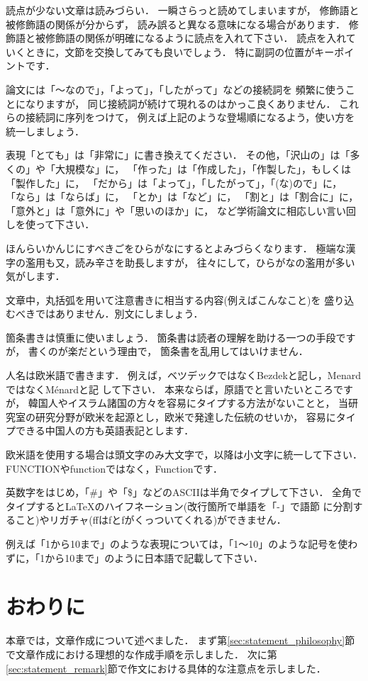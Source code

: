 \documentclass[a4j,12pt,dvipdfmx,oneside]{jsbook}
\theoremstyle{definition}
\begin{document}
読点が少ない文章は読みづらい．
一瞬さらっと読めてしまいますが，
修飾語と被修飾語の関係が分からず，
読み誤ると異なる意味になる場合があります．
修飾語と被修飾語の関係が明確になるように読点を入れて下さい．
読点を入れていくときに，文節を交換してみても良いでしょう．
特に副詞の位置がキーポイントです．

論文には「〜なので」，「よって」，「したがって」などの接続詞を
頻繁に使うことになりますが，
同じ接続詞が続けて現れるのはかっこ良くありません．
これらの接続詞に序列をつけて，
例えば上記のような登場順になるよう，使い方を統一しましょう．

表現「とても」は「非常に」に書き換えてください．
その他，「沢山の」は「多くの」や「大規模な」に，
「作った」は「作成した」，「作製した」，もしくは「製作した」に，
「だから」は「よって」，「したがって」，「(な)ので」に，
「なら」は「ならば」に，
「とか」は「など」に，
「割と」は「割合に」に，
「意外と」は「意外に」や「思いのほか」に，
など学術論文に相応しい言い回しを使って下さい．

ほんらいかんじにすべきごをひらがなにするとよみづらくなります．
極端な漢字の濫用も又，読み辛さを助長しますが，
往々にして，ひらがなの濫用が多い気がします．

文章中，丸括弧を用いて注意書きに相当する内容(例えばこんなこと)を
盛り込むべきではありません．別文にしましょう．

箇条書きは慎重に使いましょう．
箇条書は読者の理解を助ける一つの手段ですが，
書くのが楽だという理由で，
箇条書を乱用してはいけません．

人名は欧米語で書きます．
例えば，ベツデックではなくBezdekと記し，MenardではなくM\'{e}nardと記
して下さい．
本来ならば，原語でと言いたいところですが，
韓国人やイスラム諸国の方々を容易にタイプする方法がないことと，
当研究室の研究分野が欧米を起源とし，欧米で発達した伝統のせいか，
容易にタイプできる中国人の方も英語表記とします．

欧米語を使用する場合は頭文字のみ大文字で，以降は小文字に統一して下さい．
FUNCTIONやfunctionではなく，Functionです．

英数字をはじめ，「\#」や「\$」などのASCIIは半角でタイプして下さい．
全角でタイプすると\LaTeX{}のハイフネーション(改行箇所で単語を「-」で語節
に分割すること)やリガチャ(ffはfとfがくっついてくれる)ができません．

例えば「1から10まで」のような表現については，「1〜10」のような記号を使わ
ずに，「1から10まで」のように日本語で記載して下さい．

%
%
\section{おわりに}\label{sec:statement_summary}
本章では，文章作成について述べました．
まず第\ref{sec:statement_philosophy}節で文章作成における理想的な作成手順を示しました．
次に第\ref{sec:statement_remark}節で作文における具体的な注意点を示しました．
%
%
%
%
%
%
\end{document}
